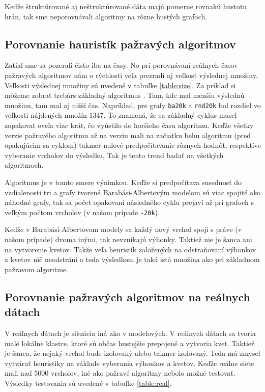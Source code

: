 Keďže štruktúrované aj neštruktúrované dáta majú pomerne rovnakú hustotu hrán, 
tak sme neporovnávali algoritmy na rôzne hustých grafoch.

\subsection{Porovnanie hauristík pažravých algoritmov}

Zatiaľ sme sa pozerali čisto iba na časy. No pri porovnávaní reálnych časov 
pažravých algoritmov nám o rýchlosti veľa prezradí aj veľkosť výslednej 
množiny. Veľkosti výslednej množiny sú uvedené v tabuľke \ref{table:size}. 
Za príklad si môžeme zobrať trebárs základný algoritmus . Tam, 
kde mal menšiu výslednú množinu, tam mal aj nižší čas. Napríklad, pre grafy 
\texttt{ba20k} a \texttt{rnd20k} bol rozdiel vo veľkosti nájdených množín 1347. 
To znamená, že sa základný cyklus musel zopakovať oveľa viac krát, čo vyústilo 
do horšieho času algoritmu. Keďže všetky verzie pažravého algoritmu až na 
verziu  mali na začiatku behu algoritmu (pred opakujúcim sa cyklom) 
takmer nulové predpočítavanie rôznych hodnôt, respektíve vyberanie vrcholov do 
výsledku, Tak je tento trend badať na všetkých algoritmoch. 

Algoritmus  je v tomto smere výnimkou. Keďže si predpočítava 
susednosť do vzdialenosti tri a grafy tvorené Barabási-Albertovým modelom sú 
viac spojité ako náhodné grafy, tak sa počet opakovaní následného cyklu prejaví 
až pri grafoch s veľkým počtom vrcholov (v našom prípade \texttt{-20k}).

Keďže v Barabási-Albertovom modely sa každý nový vrchol spojí s práve (v našom 
prípade) dvoma inými, tak nevznikajú výhonky. Taktiež nie je šanca ani na 
vytvorenie kvetov. Takže veľa heuristík založených na odstraňovaní výhonkov a 
kvetov nič neodstráni a teda výsledkom je taká istá množina ako pri základnom 
pažravom algoritme.

\subsection{Porovnanie pažravých algoritmov na reálnych dátach}

V reálnych dátach je situácia iná ako v modelových. V reálnych dátach sa tvoria 
malé lokálne klastre, ktoré sú občas hustejšie prepojené a vytvoria kvet. 
Taktiež je šanca, že nejaký vrchol bude izolovaný alebo takmer izolovaný. Teda 
má zmysel vytvárať heuristiky na základe vyberania výhonkov a kvetov. Keďže 
reálne siete mali nad 5000 vrcholov, iné ako pažravé algoritmy nebolo možné 
testovať. Výsledky testovania sú uvedené v tabuľke \ref{table:real}. 

